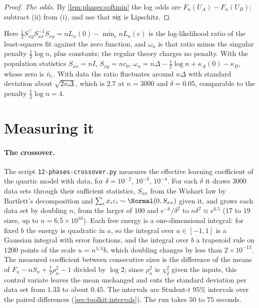 \begin{refsection}
\begin{proof}
\emph{The odds.} By \cref{lem:phases:softmin} the log odds are $F_n(U_A)-F_n(U_B)$; subtract (ii) from (i), and use that $\operatorname{sig}$ is Lipschitz.
\end{proof}

Here $\frac12S_{xy}^\top S_{xx}^{-1}S_{xy}=nL_n(0)-\min_cnL_n(c)$ is the log-likelihood ratio of the least-squares fit against the zero function, and $\omega_n$ is that ratio minus the singular penalty $\frac12\log n$, plus constants; the regular theory charges no penalty. With the population statistics $S_{xx}=nI$, $S_{xy}=nc_0$, $\omega_n=n\Delta-\frac12\log n+\kappa_A(0)-\kappa_B$, whose zero is $\bar n_c$. With data the ratio fluctuates around $n\Delta$ with standard deviation about $\sqrt{2n\Delta}$, which is $2.7$ at $n=3000$ and $\delta=0.05$, comparable to the penalty $\frac12\log n=4$.

\section{Measuring it}\label{sec:phases:measuring}

\paragraph{The crossover.} The script \texttt{12-phases-crossover.py} measures the effective learning coefficient of the quartic model with data, for $\delta=10^{-2}$, $10^{-3}$, $10^{-4}$. For each $\delta$ it draws $3000$ data sets through their sufficient statistics, $S_{xx}$ from the Wishart law by Bartlett's decomposition and $\sum_ix_i\varepsilon_i\sim\Normal(0,S_{xx})$ given it, and grows each data set by doubling $n$, from the larger of $100$ and $e^{-6}/\delta^2$ to $n\delta^2\approx e^{6.5}$ ($17$ to $19$ sizes, up to $n=6.5\times10^{10}$). Each free energy is a one-dimensional integral: for fixed $b$ the energy is quadratic in $a$, so the integral over $a\in[-1,1]$ is a Gaussian integral with error functions, and the integral over $b$ a trapezoid rule on $1200$ points of the scale $u=n^{1/4}b$, which doubling changes by less than $2\times10^{-13}$. The measured coefficient between consecutive sizes is the difference of the means of $F_n-nS_n+\frac12\rho_n^2-1$ divided by $\log2$; since $\rho_n^2$ is $\chi^2_2$ given the inputs, this control variate leaves the mean unchanged and cuts the standard deviation per data set from $1.33$ to about $0.45$. The intervals are Student-$t$ $95\%$ intervals over the paired differences (\cref{sec:toolkit:intervals}). The run takes $50$ to $75$ seconds.


\end{refsection}
